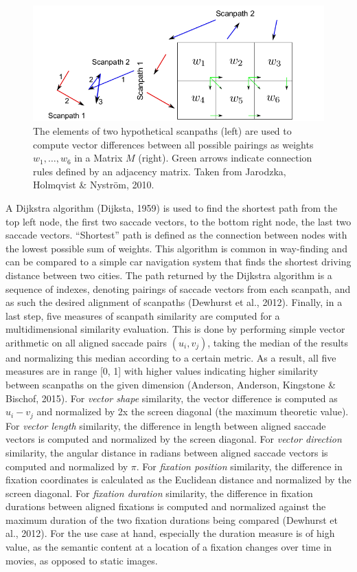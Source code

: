 \documentclass[a4paper, 11pt]{scrreprt}
\begin{document}
\begin{figure}
	\includegraphics[scale=0.4]{img/weightedgraph.png}
	\caption[Scanpath alignment as a shortest-path-problem]
	{\small{The elements of two hypothetical scanpaths (left) are used to compute vector differences between all possible pairings as weights $w_1, \ldots, w_6$ in a Matrix $M$ (right). Green arrows indicate connection rules defined by an adjacency matrix. Taken from Jarodzka, Holmqvist \& Nyström, 2010.}}
	\label{fig:directedgraph}
\end{figure}

A Dijkstra algorithm (Dijksta, 1959) is used to find the shortest path from the top left node, the first two saccade vectors, to the bottom right node, the last two saccade vectors. “Shortest” path is defined as the connection between nodes with the lowest possible sum of weights. This algorithm is common in way-finding and can be compared to a simple car navigation system that finds the shortest driving distance between two cities. The path returned by the Dijkstra algorithm is a sequence of indexes, denoting pairings of saccade vectors from each scanpath, and as such the desired alignment of scanpaths (Dewhurst et al., 2012).  Finally, in a last step, five measures of scanpath similarity are computed for a multidimensional similarity evaluation. This is done by performing simple vector arithmetic on all aligned saccade pairs $(u_i, v_j)$, taking the median of the results and normalizing this median according to a certain metric. As a result, all five measures are in range [0, 1] with higher values indicating higher similarity between scanpaths on the given dimension (Anderson, Anderson, Kingstone \& Bischof, 2015). \newline
For \textit{vector shape} similarity, the vector difference is computed as  $u_i - v_j$  and normalized by 2x the screen diagonal (the maximum theoretic value).  For \textit{vector length} similarity, the difference in length between aligned saccade vectors is computed and normalized by the screen diagonal. 
For \textit{vector direction} similarity, the angular distance in radians between aligned saccade vectors is computed and normalized by $\pi$. For \textit{fixation position} similarity, the difference in fixation coordinates is calculated as the Euclidean distance and normalized by the screen diagonal. 
For \textit{fixation duration} similarity, the difference in fixation durations between aligned fixations is computed and normalized against the maximum duration of the two fixation durations being compared (Dewhurst et al., 2012). For the use case at hand, especially the duration measure is of high value, as the semantic content at a location of a fixation changes over time in movies, as opposed to static images. 
\end{document}
